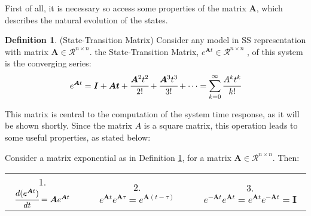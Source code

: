 \documentclass[a4paper,11pt]{book}
\numberwithin{figure}{chapter}
\numberwithin{equation}{chapter}
\numberwithin{table}{chapter}
\newtheorem{theorem}{Theorem}[chapter]
\theoremstyle{definition}
\newtheorem{definition}{Definition}[chapter]
\newcounter{boxed-theorem}
\newenvironment{boxed-theorem}[1]
{\begin{shaded} \begin{theorem}{#1}}
{\end{theorem} \end{shaded}}
\begin{document}
First of all, it is necessary so access some properties of the matrix $\bm{A}$, which describes the natural evolution of the states. 

\begin{definition}{(State-Transition Matrix)} \label{def:stateTransM}
	Consider any model in SS representation with matrix $\bm{A} \in \mathcal{R}^{n \times n}$. the State-Transition Matrix, $e^{\bm{A}t} \in \mathcal{R}^{n \times n}$ , of this system is the converging series:
\begin{equation}
	e^{\bm{A}t} = \bm{I} + \bm{At} + \cfrac{\bm{A}^2 t^2}{2!} + \cfrac{\bm{A}^3 t^3}{3!} + \cdots = \sum_{k=0}^{\infty} \cfrac{A^k t^k}{k!}
\end{equation} 
\end{definition}

This matrix is central to the computation of the system time response, as it will be shown shortly. Since the matrix $A$ is a square matrix, this operation leads to some useful properties, as stated below:

\begin{boxed-theorem}{} \label{th:stateTransMProp}
	Consider a matrix exponential as in Definition \ref{def:stateTransM}, for a matrix $\bm{A}  \in \mathcal{R}^{n \times n}$. Then:
	
\begin{tabular}{c c c c c}
		1. $\cfrac{d ( e^{\bm{A} t} )}{dt} = \bm{A} e^{\bm{A} t}$ & &
		2. $e^{\bm{A} t} e^{\bm{A} \tau} = e^{\bm{A} (t - \tau)}$ & &
		3. $e^{-\bm{A} t} e^{\bm{A} t} = e^{\bm{A} t} e^{-\bm{A} t} = \bm{I}$
	\end{tabular}
\end{boxed-theorem}
\end{document}
